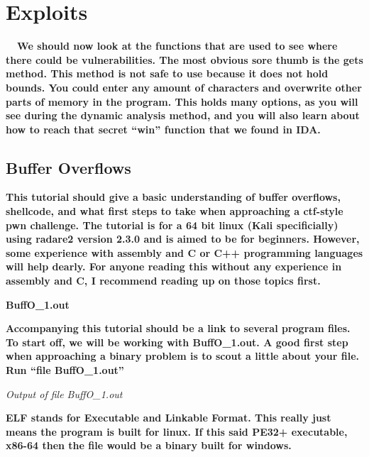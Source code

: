
\section{Exploits}

\textbf{ \ \ We should now look at the functions that are used to see where there could be vulnerabilities. The most
obvious sore thumb is the gets method. This method is not safe to use because it does not hold bounds. You could enter
any amount of characters and overwrite other parts of memory in the program. This holds many options, as you will see
during the dynamic analysis method, and you will also learn about how to reach that secret ``win'' function that we
found in IDA.}

\subsection{Buffer Overflows}

\textbf{This tutorial should give a basic understanding of buffer overflows, shellcode, and what first steps to take
when approaching a ctf-style pwn challenge. The tutorial is for a 64 bit linux (Kali specificially) using radare2
version 2.3.0 and is aimed to be for beginners. However, some experience with assembly and C or C++ programming
languages will help dearly. For anyone reading this without any experience in assembly and C, I recommend reading up on
those topics first.}

\textbf{BuffO\_1.out}

\textbf{Accompanying this tutorial should be a link to several program files. To start off, we will be working with
BuffO\_1.out. A good first step when approaching a binary problem is to scout a little about your file. Run ``file
BuffO\_1.out''}

  
 

\textit{Output of file BuffO\_1.out}

\textbf{ELF stands for Executable and Linkable Format. This really just means the program is built for linux. If this
said PE32+ executable, x86-64 then the file would be a binary built for windows.}

  
 

  
 

